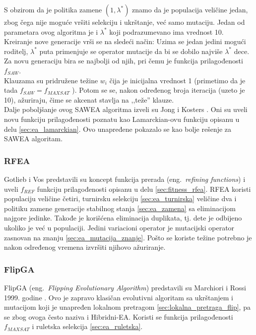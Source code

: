 \documentclass[a4paper]{article}
\begin{document}
S obzirom da je politika zamene $(1,\lambda^*)$ znamo da je populacija veličine jedan,
zbog čega nije moguće vršiti selekciju i ukrštanje, već samo mutaciju. 
Jedan od parametara ovog algoritma je i $\lambda^*$ koji podrazumevano ima vrednost 10.
Kreiranje nove generacije vrši se na sledeći način:
Uzima se jedan jedini mogući roditelj, $\lambda^*$ puta primenjuje se operator mutacije
da bi se dobilo najviše $\lambda^*$ dece. Za novu generaciju bira se najbolji od njih,
pri čemu je funkcija prilagođenosti $f_{SAW}$.\\

Klauzama su pridružene težine $w_i$ čija je inicijalna vrednost 1 
(primetimo da je tada $f_{SAW} = f_{MAXSAT}$ ). 
Potom se se, nakon određenog broja iteracija (uzeto je 10),
ažuriraju, čime se akcenat stavlja na ,,teže'' klauze.\\

Dalje poboljšanje ovog SAWEA algoritma izveli su Jong i Kosters \cite{Jong&Kosters}.
Oni su uveli novu funkciju prilagođenosti poznatu kao Lamarckian-ovu funkciju 
opisanu u delu \ref{sec:ea_lamarckian}. Ovo unapređene pokazalo se kao bolje rešenje za
SAWEA algoritam.


\subsubsection{RFEA}
\label{sec:ea_rfea}
Gotlieb i Vos \cite{GotVos98_f_ref, ea_with_table, ea_without_table} predstavili su koncept
funkcija prerada (eng.~{\em refining functions}) i uveli $f_{REF}$ funkciju prilagođenosti
opisanu u delu \ref{sec:fitness_rfea}. 
RFEA koristi populaciju veličine četiri, turnirsku selekciju \ref{sec:ea_turnirska}
veličine dva i politiku zamene generacije stabilnog stanja \ref{sec:ea_zamena} 
sa eliminacijom najgore jedinke. 
Takođe je korišćena eliminacija duplikata, tj. dete je odbijeno ukoliko je već u populaciji.
Jedini variacioni operator je mutacijski operator zasnovan na znanju \ref{sec:ea_mutacija_znanje}.
Pošto se koriste težine potrebno je nakon određenog vremena izvršiti njihovo ažuriranje.


\subsubsection{FlipGA}
\label{sec:ea_flipga}
FlipGA (eng.~{\em Flipping Evolutionary Algorithm}) predstavili su Marchiori i Rossi 1999.
godine \cite{MaRos99_flipGA, ea_with_table}. Ovo je zapravo klasičan evolutivni algoritam
sa ukrštanjem i mutacijom koji je unapređen lokalnom pretragom 
\ref{sec:lokalna_pretraga_flip}, pa se zbog ovoga često naziva i Hibridni-EA. 
Koristi se funkcija prilagođenosti $f_{MAXSAT}$ i ruletska selekcija \ref{sec:ea_ruletska}.\\
\end{document}
